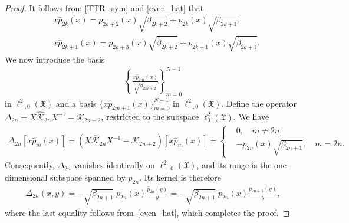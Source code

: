 \documentclass[reqno,11pt]{amsart}
\newcommand{\p}{\hat{p}}
\newcommand{\mcK}{\mathcal{K}}
\theoremstyle{plain}
\theoremstyle{definition}
\numberwithin{equation}{section}
\begin{document}
\begin{proof}
 It follows from \eqref{TTR_sym} and \eqref{even_hat} that
 \begin{align}\label{basis_tr}
 	&x\p_{2k}(x)=p_{2k+2}(x)\sqrt{\beta_{2k+2}}+p_{2k}(x)\sqrt{\beta_{2k+1}}, \\
 	&x\p_{2k+1}(x)=p_{2k+3}(x)\sqrt{\hat{\beta}_{2k+2}}+p_{2k+1}(x)\sqrt{\hat{\beta}_{2k+1}}.
\end{align}
We now introduce the basis
\begin{align}
\left\{ \frac{x\hat{p}_{2m}(x)}{\sqrt{\beta_{2m+2}}} \right\}_{m=0}^{N-1}
\end{align} 
in $\ell^2_{+,0}(\mathfrak{X})$ and a basis $\{x\hat{p}_{2m+1}(x)\}_{m=0}^{N-1}$ in
$\ell^2_{-,0}(\mathfrak{X})$. Define the operator $\Delta_{2n} = X\hat{\mathcal{K}}_{2n}X^{-1}-\mcK_{2n+2}$, 
restricted to the subspace 
$\ell^2_0(\mathfrak{X})$.
We have
 \begin{align}\label{Delta}
 	\Delta_{2n}[x\hat{p}_m(x)]=(X\hat{\mathcal{K}}_{2n}X^{-1}-\mcK_{2n+2})[x\hat{p}_m(x)]=\begin{cases}&0,\quad m\neq 2n,\\
 	&-p_{2n}(x)\sqrt{\beta_{2n+1}},\quad m=2n.
 	\end{cases}
 \end{align}
 Consequently, $\Delta_{2n}$ vanishes identically on $\ell^2_{-,0}(\mathfrak{X})$, and its range is the one-dimensional subspace spanned by $p_{2n}$. Its kernel is therefore
\begin{align}
    \Delta_{2n}(x,y)=-\sqrt{\beta_{2n+1}}\;p_{2n}(x)\frac{\p_{2n}(y)}{y}=-\sqrt{\beta_{2n+1}}\;p_{2n}(x)\frac{p_{2n+1}(y)}{y},
\end{align}
where the last equality follows from~\eqref{even_hat}, which completes the proof.
\end{proof}
\end{document}
